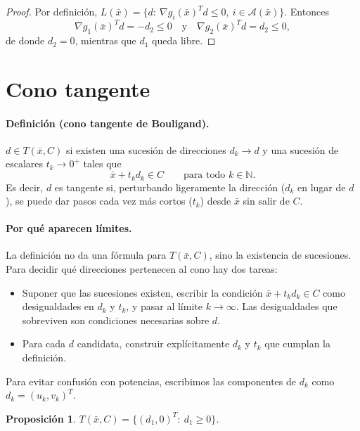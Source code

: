 \documentclass[11pt]{article}
\newtheorem{proposicion}{Proposición}
\begin{document}
\begin{proof}
Por definición, $L(\bar x)=\{d:\ \nabla g_i(\bar x)^Td\le 0,\ i\in\mathcal A(\bar x)\}$. Entonces
\[
\nabla g_1(\bar x)^Td=-d_2\le 0
\quad\text{y}\quad
\nabla g_2(\bar x)^Td=d_2\le 0,
\]
de donde $d_2=0$, mientras que $d_1$ queda libre.
\end{proof}

\section{Cono tangente}

\paragraph{Definición (cono tangente de Bouligand).}
$d\in T(\bar x,C)$ si existen una sucesión de direcciones $d_k\to d$ y una sucesión de escalares $t_k\to 0^+$ tales que
\[
\bar x+t_k d_k\in C\qquad\text{para todo }k\in\mathbb{N}.
\]
Es decir, $d$ es tangente si, perturbando ligeramente la dirección ($d_k$ en lugar de $d$), se puede dar pasos cada vez más cortos ($t_k$) desde $\bar x$ sin salir de $C$.

\paragraph{Por qué aparecen límites.} La definición no da una fórmula para $T(\bar x,C)$, sino la existencia de sucesiones. Para decidir qué direcciones pertenecen al cono hay dos tareas:
\begin{itemize}
  \item[($\subseteq$)] Suponer que las sucesiones existen, escribir la condición $\bar x+t_kd_k\in C$ como desigualdades en $d_k$ y $t_k$, y pasar al límite $k\to\infty$. Las desigualdades que sobreviven son condiciones necesarias sobre $d$.
  \item[($\supseteq$)] Para cada $d$ candidata, construir explícitamente $d_k$ y $t_k$ que cumplan la definición.
\end{itemize}
Para evitar confusión con potencias, escribimos las componentes de $d_k$ como $d_k=(u_k,v_k)^T$.

\begin{proposicion}
$T(\bar x,C)=\{(d_1,0)^T:\ d_1\ge 0\}$.
\end{proposicion}
\end{document}
